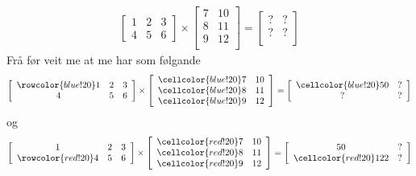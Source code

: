 \documentclass[12pt]{article}
\newcommand\x{\times}
\begin{document}
\begin{gather*}
\left[ 
\begin{array}{ccc}
1 & 2 & 3 \\
4 & 5 & 6
\end{array}
 \right] \x
\left[ 
\begin{array}{ccc}
7 & 10 \\
8 & 11 \\
9 & 12 \\
\end{array}\right]
= 
\left[ 
\begin{array}{ccc}
? & ? \\
? & ? \\
\end{array}\right]
\end{gather*}
Frå før veit me at me har som følgande
\begin{gather*}
\left[ 
\begin{array}{ccc}
\rowcolor{blue!20}
1 & 2 & 3 \\
4 & 5 & 6
\end{array}
 \right] \x
\left[ 
\begin{array}{ccc}
\cellcolor{blue!20}7 & 10 \\
\cellcolor{blue!20}8 & 11 \\
\cellcolor{blue!20}9 & 12 \\
\end{array}\right]
= 
\left[ 
\begin{array}{ccc}
\cellcolor{blue!20}50 & ? \\
? & ? \\
\end{array}\right]
\end{gather*}
og
\begin{gather*}
\left[ 
\begin{array}{ccc}
1 & 2 & 3 \\
\rowcolor{red!20}
4 & 5 & 6
\end{array}
 \right] \x
\left[ 
\begin{array}{ccc}
\cellcolor{red!20}7 & 10 \\
\cellcolor{red!20}8 & 11 \\
\cellcolor{red!20}9 & 12 \\
\end{array}\right]
= 
\left[ 
\begin{array}{ccc}
50 & ? \\
\cellcolor{red!20}
122 & ? \\
\end{array}\right]
\end{gather*}
\end{document}
